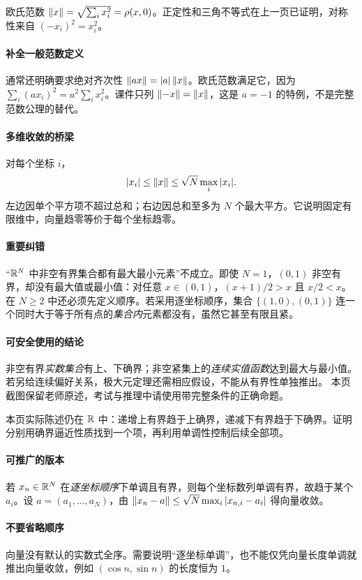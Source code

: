欧氏范数 $\left\lVert x\right\rVert=\sqrt{\sum_i x_i^2}=\rho(x,0)$。正定性和三角不等式在上一页已证明，对称性来自 $(-x_i)^2=x_i^2$。
\paragraph{补全一般范数定义}通常还明确要求绝对齐次性 $\left\lVert ax\right\rVert=|a|\left\lVert x\right\rVert$。欧氏范数满足它，因为 $\sum_i(ax_i)^2=a^2\sum_i x_i^2$。课件只列 $\left\lVert-x\right\rVert=\left\lVert x\right\rVert$，这是 $a=-1$ 的特例，不是完整范数公理的替代。
\paragraph{多维收敛的桥梁}对每个坐标 $i$，
\[|x_i|\le\left\lVert x\right\rVert\le\sqrt N\max_i|x_i|.\]
左边因单个平方项不超过总和；右边因总和至多为 $N$ 个最大平方。它说明固定有限维中，向量趋零等价于每个坐标趋零。

\paragraph{重要纠错}“$\mathbb{R}^N$ 中非空有界集合都有最大最小元素”不成立。即使 $N=1$，$(0,1)$ 非空有界，却没有最大值或最小值：对任意 $x\in(0,1)$，$(x+1)/2>x$ 且 $x/2<x$。
在 $N\ge2$ 中还必须先定义顺序。若采用逐坐标顺序，集合 $\{(1,0),(0,1)\}$ 连一个同时大于等于所有点的\emph{集合内}元素都没有，虽然它甚至有限且紧。
\paragraph{可安全使用的结论}非空有界\emph{实数集合}有上、下确界；非空紧集上的\emph{连续实值函数}达到最大与最小值。若另给连续偏好关系，极大元定理还需相应假设，不能从有界性单独推出。
本页截图保留老师原述，考试与推理中请使用带完整条件的正确命题。

本页实际陈述仍在 $\mathbb{R}$ 中：递增上有界趋于上确界，递减下有界趋于下确界。证明分别用确界逼近性质找到一个项，再利用单调性控制后续全部项。
\paragraph{可推广的版本}若 $x_n\in\mathbb{R}^N$ 在\emph{逐坐标顺序}下单调且有界，则每个坐标数列单调有界，故趋于某个 $a_i$。设 $a=(a_1,\ldots,a_N)$，由 $\left\lVert x_n-a\right\rVert\le\sqrt N\max_i|x_{n,i}-a_i|$ 得向量收敛。
\paragraph{不要省略顺序}向量没有默认的实数式全序。需要说明“逐坐标单调”，也不能仅凭向量长度单调就推出向量收敛，例如 $(\cos n,\sin n)$ 的长度恒为 $1$。

